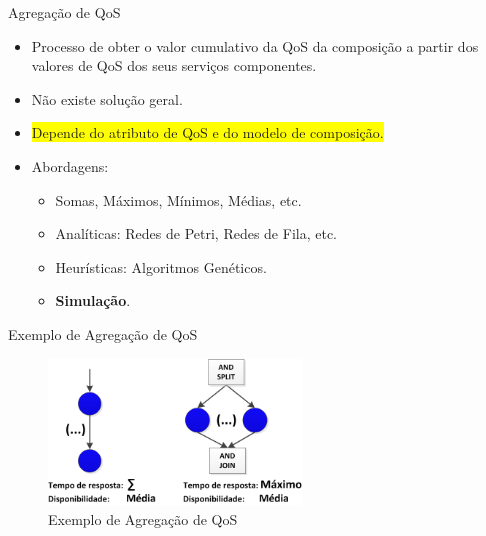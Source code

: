 \documentclass[xcolor=svgnames]{beamer}
\begin{document}
   \begin{frame}{Agregação de QoS}
        \begin{itemize}
          \item Processo de obter o valor cumulativo da QoS da composição a partir dos valores de QoS dos seus serviços
          componentes.
          \item Não existe solução geral.
          \item \colorbox{yellow}{Depende do atributo de QoS e do modelo de composição.}
          \item Abordagens:
          \begin{itemize}
            \item Somas, Máximos, Mínimos, Médias, etc.
            \item Analíticas: Redes de Petri, Redes de Fila, etc.
            \item Heurísticas: Algoritmos Genéticos.
            \item \textbf{Simulação}.
          \end{itemize}

        \end{itemize}
    \end{frame}

    \begin{frame}{Exemplo de Agregação de QoS}
      \begin{figure}[!h]
          \centering
          \includegraphics[width=0.6\textwidth]{WorkflowPatterns-QoS.png}
          \caption{Exemplo de Agregação de QoS}
      \end{figure}	
    \end{frame}
\end{document}

